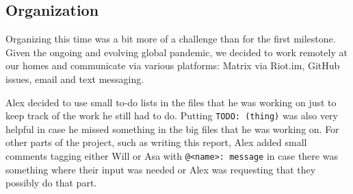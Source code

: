 \documentclass{article}
\begin{document}

\subsection{Organization}


Organizing this time was a bit more of a challenge than for the first milestone.
Given the ongoing and evolving global pandemic, we decided to work remotely at
our homes and communicate via various platforms: Matrix via Riot.im,
GitHub issues, email and text messaging.

Alex decided to use small to-do lists in the files that he was working on just
to keep track of the work he still had to do. Putting \verb|TODO: (thing)|
was also very helpful in case he missed something in the big files that he was
working on. For other parts of the project, such as writing this report, Alex
added small comments tagging either Will or Asa with \verb|@<name>: message| in
case there was something where their input was needed or Alex was requesting that
they possibly do that part.


\nocite{*}

{}

\end{document}
